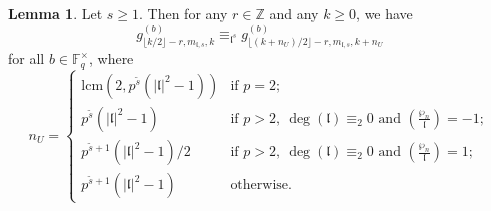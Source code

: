 \documentclass[10pt]{article}
\theoremstyle{definition}
\newtheorem{lemma}[theorem]{Lemma}
\renewcommand{\:}{\colon}
\renewcommand{\l}{\mathfrak{l}}
\begin{document}
\begin{lemma}\label{lem:n_U_ff}
    Let $s \geq 1$. Then for any $r \in \mathbb Z$ and any $k \geq 0$, we have
    \[
    g^{(b)}_{\lfloor k/2 \rfloor - r,m_{\l,s},k} \equiv_{\l^{s}} g^{(b)}_{\lfloor (k+n_U)/2 \rfloor - r,m_{\l,s},k+n_U}
    \]
    for all $b \in \mathbb F_q^\times$, where
    \[
    n_U = \begin{cases}
        \text{lcm}(2,p^{\tilde{s}}(|\l|^2-1)) & \text{if } p=2;\\
        p^{\tilde{s}}(|\l|^2-1) & \text{if } p>2,\ \deg(\l) \equiv_2 0 \text{ and } \left( \frac{\wp_n}{\l} \right) = -1;\\
        p^{\tilde{s}+1}(|\l|^2-1)/2 & \text{if }p>2,\ \deg(\l) \equiv_2 0 \text{ and } \left( \frac{\wp_n}{\l} \right) = 1;\\
        p^{\tilde{s}+1}(|\l|^2-1) & \text{otherwise.}
    \end{cases}
    \]
\end{lemma}
\end{document}
